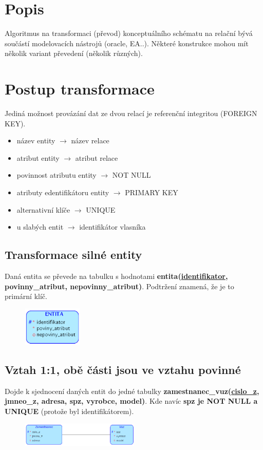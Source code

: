 \documentclass{szzclass}
\begin{document}
\tableofcontents
\newpage

\section{Popis}
Algoritmus na transformaci (převod) konceptuálního schématu na relační bývá součástí modelovacích nástrojů (oracle, EA..).
Některé konstrukce mohou mít několik variant převedení (několik různých).
\section{Postup transformace}
Jediná možnost provázání dat ze dvou relací je referenční integritou (FOREIGN KEY).
\begin{itemize}
    \item název entity $\rightarrow$ název relace
    \item atribut entity $\rightarrow$ atribut relace
    \item povinnost atributu entity $\rightarrow$ NOT NULL
    \item atributy edentifikátoru entity $\rightarrow$ PRIMARY KEY
    \item alternativní klíče $\rightarrow$ UNIQUE
    \item u slabých entit $\rightarrow$ identifikátor vlasníka
\end{itemize}

\subsection{Transformace silné entity}
Daná entita se převede na tabulku s hodnotami
\textbf{entita(\underline{identifikator}, povinny\_atribut, nepovinny\_atribut)}.
Podtržení znamená, že je to primární klíč.
\begin{figure}[h!]
    \centering
    \includegraphics[width=0.25\textwidth]{topics/bi-wsi-si-02/images/entita.png}
\end{figure}

\subsection{Vztah 1:1, obě části jsou ve vztahu povinné}
Dojde k sjednocení daných entit do jedné tabulky
\textbf{zamestnanec\_vuz(\underline{cislo\_z}, jmneo\_z, adresa, spz, vyrobce, model)}.
Kde navíc \textbf{spz je NOT NULL a UNIQUE} (protože byl identifikátorem).
\begin{figure}[h!]
    \centering
    \includegraphics[width=0.5\textwidth]{topics/bi-wsi-si-02/images/oneToOne.png}
\end{figure}
\end{document}
